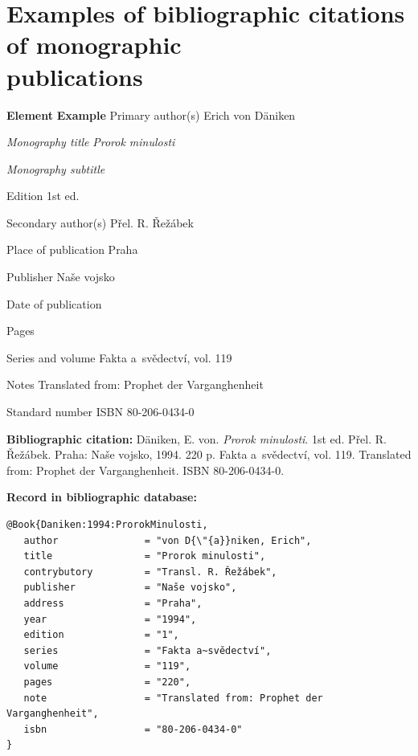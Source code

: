 \section*{Examples of bibliographic citations of monographic \\publications}
\label{pr-monografie1}
\begin{tabbing} 
\zarazky
\textbf{Element} \> \textbf{Example} \odradkovani
Primary author(s) \>
Erich von {\sc D{\"a}niken}

\odradkovani
{\em Monography title} \>
{\em Prorok minulosti}

\odradkovani
{\em Monography subtitle}\footnotemark[1] \>

\odradkovani
Edition \>
1st ed.

\odradkovani
Secondary author(s)\footnotemark[1] \>
Přel. R. Řežábek

\odradkovani
Place of publication \>
Praha

\odradkovani
Publisher \>
Naše vojsko

\odradkovani
Date of publication 

\odradkovani
Pages 

\odradkovani
Series and volume \>
Fakta a~svědectví, vol. 119

\odradkovani
Notes\footnotemark[2] \>
Translated from: Prophet der Varganghenheit

\odradkovani
Standard number \>
ISBN 80-206-0434-0

\odradkovani
\end{tabbing}

\noindent \textbf{Bibliographic citation:} \odradkovani
{\sc D{\"a}niken}, E. von. {\em Prorok minulosti}. 1st ed. Přel. R. Řežábek. Praha: Naše vojsko, 1994. 220 p. Fakta a~svědectví, vol. 119. Translated from: Prophet der Varganghenheit. ISBN 80-206-0434-0.

\bigskip \bigskip
\noindent \textbf{Record in bibliographic database:}
\vspace{-0.5em}
\begin{verbatim}
@Book{Daniken:1994:ProrokMinulosti,
   author               = "von D{\"{a}}niken, Erich",
   title                = "Prorok minulosti",
   contrybutory         = "Transl. R. Řežábek",
   publisher            = "Naše vojsko",
   address              = "Praha",
   year                 = "1994",
   edition              = "1",
   series               = "Fakta a~svědectví",
   volume               = "119",
   pages                = "220",
   note                 = "Translated from: Prophet der Varganghenheit",
   isbn                 = "80-206-0434-0"
}
\end{verbatim}

